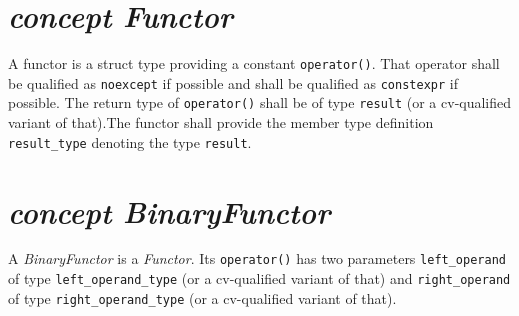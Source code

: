 %
%
%
%
%
%
%

\section{\textit{concept Functor}}
A functor is a struct type providing a constant  \texttt{operator()}.
That operator shall be qualified as \texttt{noexcept}     if possible
and shall be qualified as \texttt{constexpr} if possible.  The return
type of \texttt{operator()} shall be of type \texttt{result}    (or a
cv-qualified variant of that).\newline\noindent{}The functor    shall
provide the member type definition \texttt{result\_type} denoting the
type \texttt{result}.

\section{\textit{concept BinaryFunctor}}
A \textit{BinaryFunctor} is a \textit{Functor}.
Its \texttt{operator()} has two parameters \texttt{left\_operand} of type
\texttt{left\_operand\_type} (or a cv-qualified variant of that)      and 
\texttt{right\_operand} of type \texttt{right\_operand\_type} (or       a
cv-qualified variant of that).\newline

